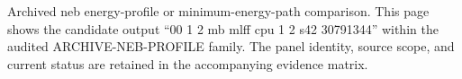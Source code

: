 Archived neb energy-profile or minimum-energy-path comparison. This page shows the candidate output ``00 1 2 mb mlff cpu 1 2 s42 30791344'' within the audited ARCHIVE-NEB-PROFILE family. The panel identity, source scope, and current status are retained in the accompanying evidence matrix.
